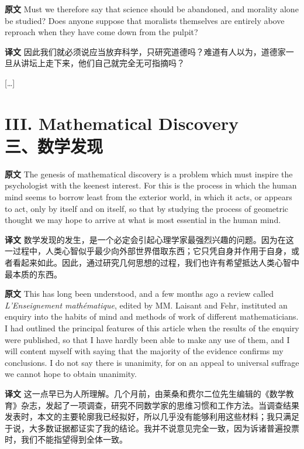 \documentclass[UTF8,zihao=-4]{ctexart}
\newcommand{\BodyFont}{\fontsize{10.5pt}{15.5pt}\selectfont}
\newcommand{\origlabel}{\textbf{原文}\quad}
\newcommand{\translabel}{\textbf{译文}\quad}
\newenvironment{enblock}{\par\noindent\begingroup\BodyFont\origlabel}{\par\endgroup}
\newenvironment{zhblock}{\par\noindent\begingroup\BodyFont\translabel}{\par\endgroup\vspace{0.35em}}
\begin{document}
\begin{enblock}
Must we therefore say that science should be abandoned, and morality alone be studied? Does anyone suppose that moralists themselves are entirely above reproach when they have come down from the pulpit?
\end{enblock}
\begin{zhblock}
因此我们就必须说应当放弃科学，只研究道德吗？难道有人以为，道德家一旦从讲坛上走下来，他们自己就完全无可指摘吗？
\end{zhblock}

\begin{center}
[\dots]
\end{center}

\section*{III. Mathematical Discovery\\三、数学发现}

\begin{enblock}
The genesis of mathematical discovery is a problem which must inspire the psychologist with the keenest interest. For this is the process in which the human mind seems to borrow least from the exterior world, in which it acts, or appears to act, only by itself and on itself, so that by studying the process of geometric thought we may hope to arrive at what is most essential in the human mind.
\end{enblock}
\begin{zhblock}
数学发现的发生，是一个必定会引起心理学家最强烈兴趣的问题。因为在这一过程中，人类心智似乎最少向外部世界借取东西；它只凭自身并作用于自身，或者看起来如此。因此，通过研究几何思想的过程，我们也许有希望抵达人类心智中最本质的东西。\end{zhblock}

\begin{enblock}
This has long been understood, and a few months ago a review called \emph{L'Enseignement mathématique}, edited by MM. Laisant and Fehr, instituted an enquiry into the habits of mind and methods of work of different mathematicians. I had outlined the principal features of this article when the results of the enquiry were published, so that I have hardly been able to make any use of them, and I will content myself with saying that the majority of the evidence confirms my conclusions. I do not say there is unanimity, for on an appeal to universal suffrage we cannot hope to obtain unanimity.
\end{enblock}
\begin{zhblock}
这一点早已为人所理解。几个月前，由莱桑和费尔二位先生编辑的《数学教育》杂志，发起了一项调查，研究不同数学家的思维习惯和工作方法。当调查结果发表时，本文的主要轮廓我已经拟好，所以几乎没有能够利用这些材料；我只满足于说，大多数证据都证实了我的结论。我并不说意见完全一致，因为诉诸普遍投票时，我们不能指望得到全体一致。\end{zhblock}
\end{document}
